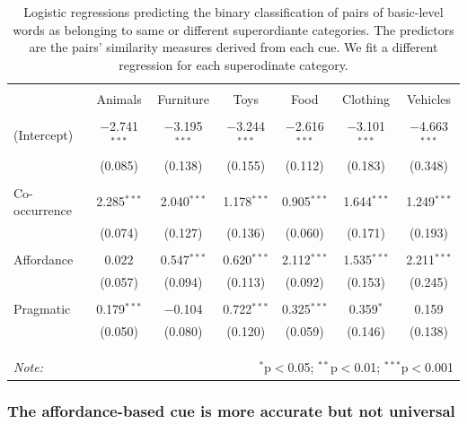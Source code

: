 \documentclass[english,,man,floatsintext]{apa6}
\begin{document}
\begin{table}[!htbp] \centering 
\caption{\label{tab:regressions} Logistic regressions predicting the binary classification of pairs of basic-level words as belonging to same or different superordiante categories. The predictors are the pairs' similarity measures derived from each cue. We fit a different regression for each superodinate category.} 
\label{} 
\begin{tabular}{@{\extracolsep{5pt}}lcccccc} 
\hline 
 & \multicolumn{6}{c}{} \\
 & Animals & Furniture & Toys & Food & Clothing & Vehicles \\ 
\hline \\[-1.8ex] 
 (Intercept) & $-$2.741$^{***}$ & $-$3.195$^{***}$ & $-$3.244$^{***}$ & $-$2.616$^{***}$ & $-$3.101$^{***}$ & $-$4.663$^{***}$ \\ 
  & (0.085) & (0.138) & (0.155) & (0.112) & (0.183) & (0.348) \\ 
  & & & & & & \\ 
 Co-occurrence & 2.285$^{***}$ & 2.040$^{***}$ & 1.178$^{***}$ & 0.905$^{***}$ & 1.644$^{***}$ & 1.249$^{***}$ \\ 
  & (0.074) & (0.127) & (0.136) & (0.060) & (0.171) & (0.193) \\ 
  & & & & & & \\ 
 Affordance & 0.022 & 0.547$^{***}$ & 0.620$^{***}$ & 2.112$^{***}$ & 1.535$^{***}$ & 2.211$^{***}$ \\ 
  & (0.057) & (0.094) & (0.113) & (0.092) & (0.153) & (0.245) \\ 
  & & & & & & \\ 
 Pragmatic & 0.179$^{***}$ & $-$0.104 & 0.722$^{***}$ & 0.325$^{***}$ & 0.359$^{*}$ & 0.159 \\ 
  & (0.050) & (0.080) & (0.120) & (0.059) & (0.146) & (0.138) \\ 
  & & & & & & \\ 
 \\[-1.8ex] 

\hline \\[-1.8ex] 
\textit{Note:}  & \multicolumn{6}{r}{$^{*}$p$<$0.05; $^{**}$p$<$0.01; $^{***}$p$<$0.001} \\ 
\end{tabular} 
\end{table}

\hypertarget{the-affordance-based-cue-is-more-accurate-but-not-universal}{%
\subsubsection{The affordance-based cue is more accurate but not universal}\label{the-affordance-based-cue-is-more-accurate-but-not-universal}}
\end{document}
